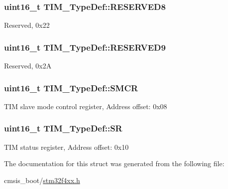 \subsubsection[{\texorpdfstring{R\+E\+S\+E\+R\+V\+E\+D8}{RESERVED8}}]{\setlength{\rightskip}{0pt plus 5cm}uint16\+\_\+t T\+I\+M\+\_\+\+Type\+Def\+::\+R\+E\+S\+E\+R\+V\+E\+D8}\hypertarget{struct_t_i_m___type_def_ac708e4f0f142ac14d7e1c46778ed6f96}{}\label{struct_t_i_m___type_def_ac708e4f0f142ac14d7e1c46778ed6f96}
Reserved, 0x22 
\subsubsection[{\texorpdfstring{R\+E\+S\+E\+R\+V\+E\+D9}{RESERVED9}}]{\setlength{\rightskip}{0pt plus 5cm}uint16\+\_\+t T\+I\+M\+\_\+\+Type\+Def\+::\+R\+E\+S\+E\+R\+V\+E\+D9}\hypertarget{struct_t_i_m___type_def_a6754dd714ff0885e8e511977d2f393ce}{}\label{struct_t_i_m___type_def_a6754dd714ff0885e8e511977d2f393ce}
Reserved, 0x2A 
\subsubsection[{\texorpdfstring{S\+M\+CR}{SMCR}}]{ uint16\+\_\+t T\+I\+M\+\_\+\+Type\+Def\+::\+S\+M\+CR}\hypertarget{struct_t_i_m___type_def_a476012f1b4567ffc21ded0b5fd50985e}{}\label{struct_t_i_m___type_def_a476012f1b4567ffc21ded0b5fd50985e}
T\+IM slave mode control register, Address offset\+: 0x08 
\subsubsection[{\texorpdfstring{SR}{SR}}]{ uint16\+\_\+t T\+I\+M\+\_\+\+Type\+Def\+::\+SR}\hypertarget{struct_t_i_m___type_def_af686e22c1792dc59dfeffe451d47cf13}{}\label{struct_t_i_m___type_def_af686e22c1792dc59dfeffe451d47cf13}
T\+IM status register, Address offset\+: 0x10 

The documentation for this struct was generated from the following file\+:\begin{DoxyCompactItemize}
\item 
cmsis\+\_\+boot/\hyperlink{stm32f4xx_8h}{stm32f4xx.\+h}\end{DoxyCompactItemize}
